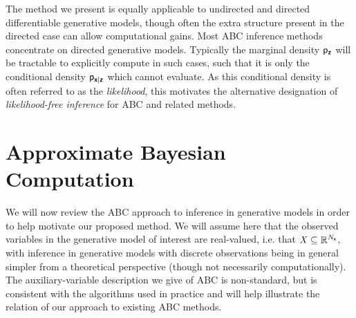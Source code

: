 The method we present is equally applicable to undirected and directed differentiable generative models, though often the extra structure present in the directed case can allow computational gains. Most \ac{ABC} inference methods concentrate on directed generative models. Typically the marginal density $\mathsf{p}_{\boldsymbol{\mathsf{z}}}$ will be tractable to explicitly compute in such cases, such that it is only the conditional density $\mathsf{p}_{\boldsymbol{\mathsf{x}}|\boldsymbol{\mathsf{z}}}$ which cannot evaluate. As this conditional density is often referred to as the \emph{likelihood}, this motivates the alternative designation of \emph{likelihood-free inference} for \ac{ABC} and related methods.



\section{Approximate Bayesian Computation}\label{sec:abc}

We will now review the \ac{ABC} approach to inference in generative models in order to help motivate our proposed method. We will assume here that the observed variables in the generative model of interest are real-valued, i.e. that $\mathit{X} \subseteq \mathbb{R}^{N_{\boldsymbol{\mathsf{x}}}}$, with inference in generative models with discrete observations being in general simpler from a theoretical perspective (though not necessarily computationally). The auxiliary-variable description we give of \ac{ABC} is non-standard, but is consistent with the algorithms used in practice and will help illustrate the relation of our approach to existing \ac{ABC} methods.

